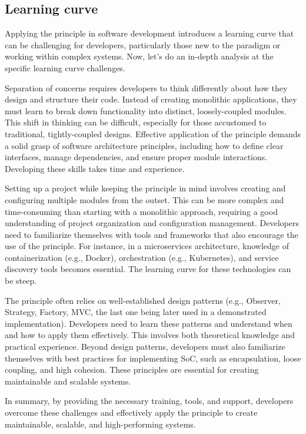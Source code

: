 \subsection{Learning curve}
Applying the principle in software development introduces a learning curve that can be challenging for developers, particularly those new to the paradigm or working within complex systems. Now, let's do an in-depth analysis at the specific learning curve challenges.
\par
Separation of concerns requires developers to think differently about how they design and structure their code. Instead of creating monolithic applications, they must learn to break down functionality into distinct, loosely-coupled modules. This shift in thinking can be difficult, especially for those accustomed to traditional, tightly-coupled designs.
Effective application of the principle demands a solid grasp of software architecture principles, including how to define clear interfaces, manage dependencies, and ensure proper module interactions. Developing these skills takes time and experience.
\par
Setting up a project while keeping the principle in mind involves creating and configuring multiple modules from the outset. This can be more complex and time-consuming than starting with a monolithic approach, requiring a good understanding of project organization and configuration management.
Developers need to familiarize themselves with tools and frameworks that also encourage the use of the principle. For instance, in a microservices architecture, knowledge of containerization (e.g., Docker), orchestration (e.g., Kubernetes), and service discovery tools becomes essential. The learning curve for these technologies can be steep.
\par
The principle often relies on well-established design patterns (e.g., Observer, Strategy, Factory, MVC, the last one being later used in a demonstrated implementation). Developers need to learn these patterns and understand when and how to apply them effectively. This involves both theoretical knowledge and practical experience.
Beyond design patterns, developers must also familiarize themselves with best practices for implementing SoC, such as encapsulation, loose coupling, and high cohesion. These principles are essential for creating maintainable and scalable systems.
\par
In summary, by providing the necessary training, tools, and support, developers overcome these challenges and effectively apply the principle to create maintainable, scalable, and high-performing systems.

